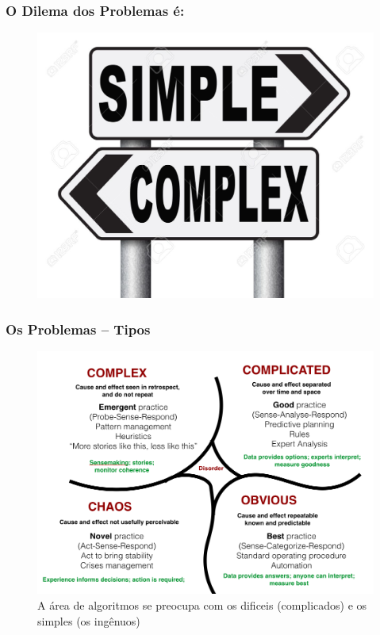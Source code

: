 \documentclass[10pt]{beamer}
\begin{document}
\begin{frame}[fragile]

\frametitle{O Dilema dos Problemas  é:}

\begin{figure}[!ht]
\centering
\includegraphics[height =.65\textheight,width=.8\textwidth]
{figuras/dilema_eh.jpg}
\end{figure}

\end{frame}







\begin{frame}[fragile]

\frametitle{Os  Problemas -- Tipos}
\begin{figure}[!ht]
\centering
\includegraphics[height =.65\textheight,width=.8\textwidth]
{figuras/os_problemas.png}
\caption{A área de algoritmos se preocupa com os  dificeis (complicados) e os simples (os ingênuos)}
\end{figure}

\end{frame}
\end{document}
